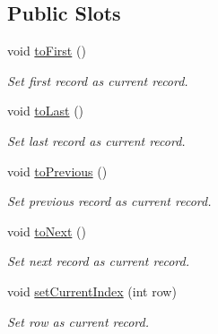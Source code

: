 \subsection*{Public Slots}
\begin{DoxyCompactItemize}
\item 
void \hyperlink{classmdt_sql_form_widget_a4bb7ddf419e845de2d1a7c1ef95e48a8}{to\-First} ()
\begin{DoxyCompactList}\small\item\em Set first record as current record. \end{DoxyCompactList}\item 
void \hyperlink{classmdt_sql_form_widget_aefbaa029ac6141ab3d12da2a27d30dda}{to\-Last} ()
\begin{DoxyCompactList}\small\item\em Set last record as current record. \end{DoxyCompactList}\item 
void \hyperlink{classmdt_sql_form_widget_a7dc4bc0b63b10d420f7ab04a43e4f371}{to\-Previous} ()
\begin{DoxyCompactList}\small\item\em Set previous record as current record. \end{DoxyCompactList}\item 
void \hyperlink{classmdt_sql_form_widget_a49496a848e015ed8335a2bfd33906000}{to\-Next} ()
\begin{DoxyCompactList}\small\item\em Set next record as current record. \end{DoxyCompactList}\item 
void \hyperlink{classmdt_sql_form_widget_a982e8e8347ec4f98bf3df6980997a2db}{set\-Current\-Index} (int row)
\begin{DoxyCompactList}\small\item\em Set row as current record. \end{DoxyCompactList}\end{DoxyCompactItemize}

